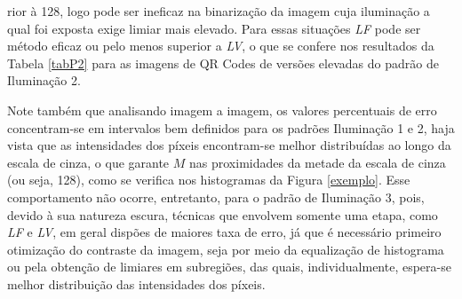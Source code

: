 \documentclass{ceel}
\begin{document}
\begin{multicols}{2}
\begin{minipage}[h]{\columnwidth}
\vspace{-0.1cm}
\caption{Imagens resultantes da Binarização em Sub-regiões para o QR Code 3 nos padrões de (a) Iluminação 1, (c) Iluminação 2 e (e) Iluminação 3, com suas respectivas imagens diferença em (b), (d) e (f).} \label{figS}
\end{minipage}

\vspace{0.4cm}
\noindent rior à 128, logo pode ser ineficaz na binarização da imagem cuja iluminação a qual foi exposta exige limiar mais elevado. Para essas situações \emph{LF} pode ser método eficaz ou pelo menos superior a \emph{LV}, o que se confere nos resultados da Tabela \ref{tabP2} para as imagens de QR Codes de versões elevadas do padrão de Iluminação 2.

Note também que analisando imagem a imagem, os valores percentuais de erro concentram-se em intervalos bem definidos para os padrões Iluminação 1 e 2, haja vista que as intensidades dos píxeis encontram-se melhor distribuídas ao longo da escala de cinza, o que garante $M$ nas proximidades da metade da escala de cinza (ou seja, 128), como se verifica nos histogramas da Figura \ref{exemplo}. Esse comportamento não ocorre, entretanto, para o padrão de Iluminação 3, pois, devido à sua natureza escura, técnicas que envolvem somente uma etapa, como \emph{LF} e \emph{LV}, em geral dispões de maiores taxa de erro, já que é necessário primeiro otimização do contraste da imagem, seja por meio da equalização de histograma ou pela obtenção de limiares em subregiões, das quais, individualmente, espera-se melhor distribuição das intensidades dos píxeis.



\end{multicols}
\end{document}
